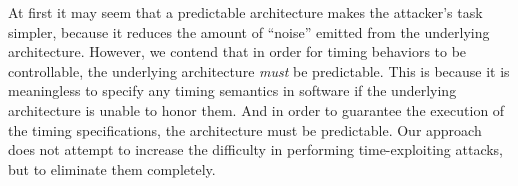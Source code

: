 At first it may seem that a predictable architecture makes the attacker's task simpler, because it reduces the amount of ``noise'' emitted from the underlying architecture.
However, we contend that in order for timing behaviors to be controllable, the underlying architecture \textit{must} be predictable.
This is because it is meaningless to specify any timing semantics in software if the underlying architecture is unable to honor them.
And in order to guarantee the execution of the timing specifications, the architecture must be predictable. 
Our approach does not attempt to increase the difficulty in performing time-exploiting attacks, but to eliminate them completely. 

